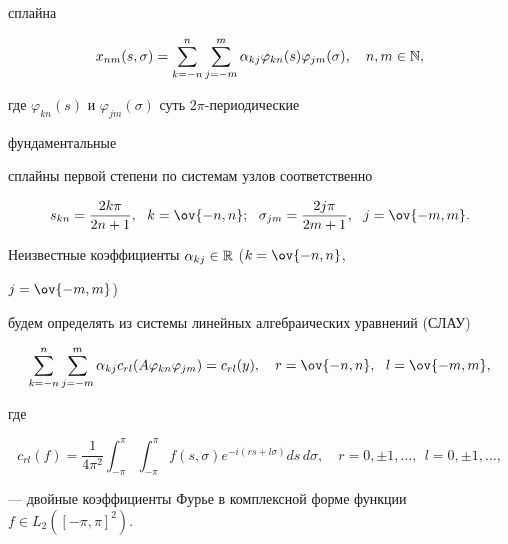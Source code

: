 сплайна 


\begin{equation} 


x_{n m}(s,\sigma)=\sum^n_{k=-n}\sum^m_{j=-m}\alpha_{k j} 


\varphi_{k n}(s)\varphi_{j m}(\sigma),\quad n,m\in\Bbb N, 


\end{equation} 


где $\varphi_{k n}(s)$ и $\varphi_{j m}(\sigma)$ суть $2\pi$-периодические 


фундаментальные 


сплайны первой степени по системам узлов соответственно 


\begin{equation} 


s_{k n}=\frac{2k\pi}{2n+1},\ \ k=\ov{-n,n};\ \ 


\sigma_{j m}=\frac{2j\pi}{2m+1},\ \ j=\ov{-m,m}. 


\end{equation} 


Неизвестные коэффициенты $\alpha_{k j}\in\Bbb R$ ($k=\ov{-n,n}$, 


$j=\ov{-m,m}$) 


будем определять из системы линейных алгебраических уравнений (СЛАУ) 


\begin{equation} 


\sum^n_{k=-n}\sum^m_{j=-m}\alpha_{k j}c_{r l}(A\varphi_{k n} 


\varphi_{j m})=c_{r l}(y),\quad 


r=\ov{-n,n},\ \ l=\ov{-m,m}, 


\end{equation} 


где 


\begin{equation} 


c_{r l}(f)=\frac{1}{4\pi^2}\int^\pi_{-\pi}\int^\pi_{-\pi} 


f(s,\sigma)e^{-i(r s+l\sigma)}ds\,d\sigma,\quad 


r=0,\pm1,\dotsc,\ \ l=0,\pm1,\dotsc, 


\end{equation} 


--- двойные коэффициенты Фурье в комплексной форме функции $f\in 


L_2([-\pi,\pi]^2)$. 


 


